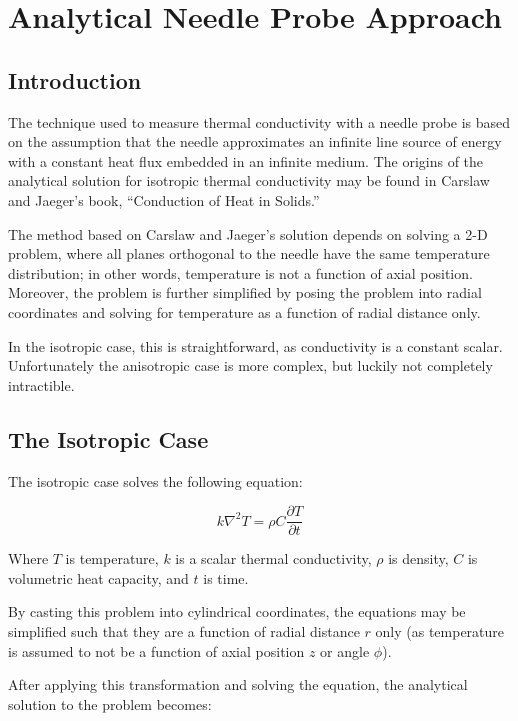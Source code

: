 \chapter{Analytical Needle Probe Approach}
\label{sec:analytical-np}
\bigskip

\section{Introduction}

The technique used to measure thermal conductivity with a needle probe is based
on the assumption that the needle approximates an infinite line source of energy
with a constant heat flux embedded in an infinite medium. The origins of the
analytical solution for isotropic thermal conductivity may be found in Carslaw
and Jaeger's book, ``Conduction of Heat in Solids.'' \cite{basictheory}

The method based on Carslaw and Jaeger's solution depends on solving a 2-D
problem, where all planes orthogonal to the needle have the same temperature
distribution; in other words, temperature is not a function of axial position.
Moreover, the problem is further simplified by posing the problem into radial
coordinates and solving for temperature as a function of radial distance only.

In the isotropic case, this is straightforward, as conductivity is a constant
scalar. Unfortunately the anisotropic case is more complex, but luckily not
completely intractible.

\section{The Isotropic Case}

The isotropic case solves the following equation:

\begin{equation*}
k\nabla^2 T = \rho C\frac{\partial T}{\partial t}
\end{equation*}

Where \(T\) is temperature, \(k\) is a scalar thermal conductivity, \(\rho\) is
density, \(C\) is volumetric heat capacity, and \(t\) is time.

By casting this problem into cylindrical coordinates, the equations may be
simplified such that they are a function of radial distance \(r\) only (as
temperature is assumed to not be a function of axial position \(z\) or angle
\(\phi\)).

After applying this transformation and solving the equation, the analytical
solution to the problem becomes:

